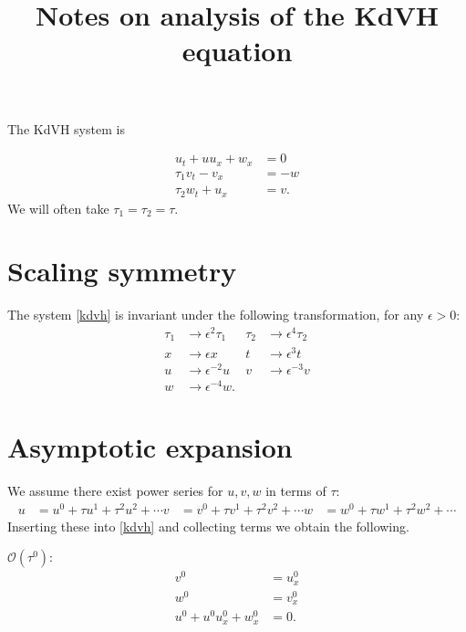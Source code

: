 \documentclass{article}
\title{Notes on analysis of the KdVH equation}
\theoremstyle{plain}
\theoremstyle{definition}
\numberwithin{theorem}{section}
\newcommand{\order}{{\mathcal O}}
\begin{document}
\maketitle

The KdVH system is

\begin{subequations} \label{kdvh}
\begin{align}
    u_t + uu_x + w_x & = 0 \\
    \tau_1 v_t - v_x & = -w \\
    \tau_2 w_t + u_x & = v.
\end{align}
\end{subequations}
We will often take $\tau_1 = \tau_2 = \tau$.

\section{Scaling symmetry}
The system \eqref{kdvh} is invariant under the following
transformation, for any $\epsilon>0$:
\begin{subequations}
\label{eq:scaling}
\begin{align}
    \tau_1 & \to \epsilon^2 \tau_1 & \tau_2 & \to \epsilon^4 \tau_2 \\
    x & \to \epsilon x & t & \to \epsilon^3 t \\
    u & \to \epsilon^{-2} u & v & \to \epsilon^{-3} v \\
    w & \to \epsilon^{-4} w.
\end{align}
\end{subequations}


\section{Asymptotic expansion}
We assume there exist power series for $u, v, w$ in terms of $\tau$:
\begin{align}
    u & = u^0 + \tau u^1 + \tau^2 u^2 + \cdots
    v & = v^0 + \tau v^1 + \tau^2 v^2 + \cdots
    w & = w^0 + \tau w^1 + \tau^2 w^2 + \cdots
\end{align}
Inserting these into \eqref{kdvh} and collecting terms we obtain the following.

$\order(\tau^0)$:
\begin{subequations}
\begin{align}
    v^0 & = u^0_x \\
    w^0 & = v^0_x \\
    u^0 + u^0 u^0_x + w^0_x & = 0.
\end{align}
\end{subequations}
\end{document}
